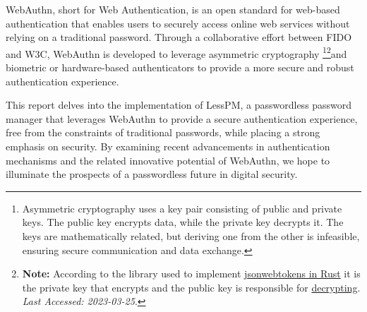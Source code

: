\newcommand{\assymetricCrypto}{\footnote{Asymmetric cryptography uses a key pair consisting of public and private keys. The public key encrypts
data, while the private key decrypts it. The keys are mathematically related, but deriving one from the other
is infeasible, ensuring secure communication and data exchange.}}
\newcommand{\jsonwebLibrary}{\footnote{
    \textbf{Note:} According to the library used to implement
    \href{https://docs.rs/jsonwebtoken/latest/jsonwebtoken/index.html}{jsonwebtokens in Rust}
    it is the private key that encrypts and the public key is responsible for \href{https://docs.rs/jsonwebtoken/latest/jsonwebtoken/struct.DecodingKey.html#method.from_rsa_pem}
    {decrypting}. \textit{Last Accessed: 2023-03-25}.}}

WebAuthn, short for Web Authentication, is an open standard for web-based authentication that enables users to
securely access online web services without relying on a traditional password.
Through a collaborative effort between FIDO and W3C, WebAuthn is developed to leverage asymmetric cryptography
\assymetricCrypto\jsonwebLibrary and biometric or hardware-based authenticators to provide a more secure and robust authentication experience.

This report delves into the implementation of LessPM, a passwordless password manager that leverages WebAuthn to provide
a secure authentication experience, free from the constraints of traditional passwords, while placing a strong emphasis
on security.
By examining recent advancements in authentication mechanisms and the related innovative potential of WebAuthn, we
hope to illuminate the prospects of a passwordless future in digital security.


